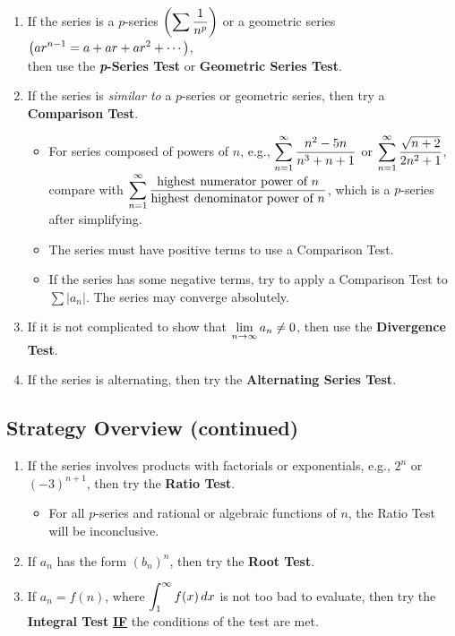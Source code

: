 \documentclass[12pt]{article}
\begin{document}
\begin{enumerate}
\item[\tc{1}] If the series is a $p$-series $\displaystyle\left(\sum\dfrac{1}{n^p}\right)$ or a geometric series $\displaystyle\left(a r^{n-1}=a+ar+ar^2+\cdots\right)$, \\
then use the \textbf{\textit{p}-Series Test} or \textbf{Geometric Series Test}.

\item[\tc{2}] If the series is \textit{similar to} a $p$-series or geometric series, then try a \textbf{Comparison Test}.
\begin{itemize}
	\item For series composed of powers of $n$, e.g., $\displaystyle\sum_{n=1}^\infty\dfrac{n^2-5n}{n^3+n+1}$ or $\displaystyle\sum_{n=1}^\infty\dfrac{\sqrt{n+2}}{2n^2+1}$, compare with $\displaystyle\sum_{n=1}^\infty \dfrac{\text{highest numerator power of }n}{\text{highest denominator power of }n}$, which is a $p$-series after simplifying.
	\item The series must have positive terms to use a Comparison Test. 
	\item If the series has some negative terms, try to apply a Comparison Test to $\sum|a_n|$. The series may converge absolutely.
\end{itemize}

\item[\tc{3}] If it is not complicated to show that $\displaystyle\lim_{n\to\infty}a_n\neq 0$, then use the \textbf{Divergence Test}.

\item[\tc{4}] If the series is alternating, then try the \textbf{Alternating Series Test}.
\end{enumerate}

\newpage

\subsection*{Strategy Overview (continued)}
\begin{enumerate}
\item[\tc{5}] If the series involves products with factorials or exponentials, e.g., $2^n$ or $(-3)^{n+1}$,  then try the \textbf{Ratio Test}.
\begin{itemize}
	\item For all $p$-series and rational or algebraic functions of $n$, the Ratio Test will be inconclusive.
\end{itemize}
\item[\tc{6}] If $a_n$ has the form $\left(b_n\right)^n$, then try the \textbf{Root Test}.

\item[\tc{7}] If $a_n=f(n)$, where $\displaystyle\int_1^\infty f(x)\,dx$ is not too bad to evaluate, then try the \textbf{Integral Test} \textbf{\underline{IF}} the conditions of the test are met.
\end{enumerate}
\end{document}
